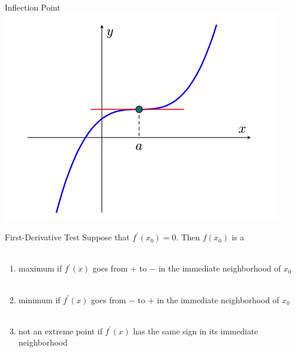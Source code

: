 \documentclass{./../../Latex/teaching_slides}
\begin{document}
\begin{frame}{Inflection Point}
\centering
\includegraphics[scale=0.5]{inflection.png}
\end{frame}

\begin{frame}{First-Derivative Test}
Suppose that $f^{\prime}\left(x_{0}\right)=0$. Then $f\left(x_{0}\right)$ is a \\~\\

\begin{enumerate}
  \item maximum if $f^{\prime}(x)$ goes from $+$ to $-$ in the immediate neighborhood of $x_{0}$ \\~\\
  \item minimum if $f^{\prime}(x)$ goes from $-$ to $+$ in the immediate neighborhood of $x_{0}$ \\~\\

  \item not an extreme point if $f^{\prime}(x)$ has the same sign in its immediate neighborhood
\end{enumerate}
\end{frame}
\end{document}
